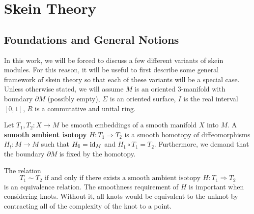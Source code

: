 \chapter{Skein Theory} \label{chapter2}


\section{Foundations and General Notions} \label{sec:foundations}
In this work, we will be forced to discuss a few different variants of skein modules. For this reason, it will be useful to first describe some general framework of skein theory so that each of these variants will be a special case. Unless otherwise stated, we will assume $M$ is an oriented $3$-manifold with boundary $\partial M$ (possibly empty), $\Sigma$ is an oriented surface, $I$ is the real interval $[0,1]$, $R$ is a commutative and unital ring. 

\begin{definition}
    Let $T_1, T_2: X \to M$ be smooth embeddings of a smooth manifold $X$ into $M$. A \textbf{smooth ambient isotopy} $H: T_1 \Rightarrow T_2$ is a smooth homotopy of diffeomorphisms $H_t: M \to M$ such that $H_0={\rm{id}}_M$ and $H_1 \circ T_1 = T_2$. Furthermore, we demand that the boundary $\partial M$ is fixed by the homotopy. 
\end{definition}

The relation 
\[
T_1 \sim T_2 \textrm{ if and only if there exists a smooth ambient isotopy } H: T_1 \Rightarrow T_2
\]
is an equivalence relation. The smoothness requirement of $H$ is important when considering knots. Without it, all knots would be equivalent to the unknot by contracting all of the complexity of the knot to a point. 

